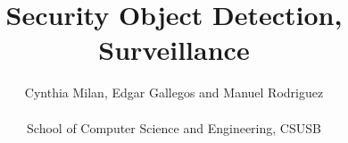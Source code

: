 \documentclass[twocolumn]{cinc}
\begin{document}
\title{Security Object Detection, Surveillance}

\author {Cynthia Milan, Edgar Gallegos and Manuel Rodriguez \\
\ \\
School of Computer Science and Engineering, CSUSB 
}

\maketitle






 














\end{document}
